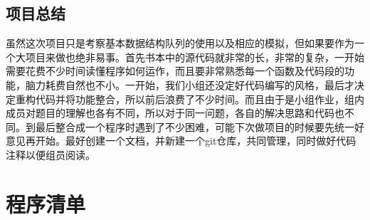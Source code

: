 \documentclass[12pt,UTF8]{ctexart}
\begin{document}
\begin{spacing}{1.4}
\section{项目总结}
	虽然这次项目只是考察基本数据结构队列的使用以及相应的模拟，但如果要作为一个大项目来做也绝非易事。首先书本中的源代码就非常的长，非常的复杂，一开始需要花费不少时间读懂程序如何运作，而且要非常熟悉每一个函数及代码段的功能，脑力耗费自然也不小。一开始，我们小组还没定好代码编写的风格，最后才决定重构代码并将功能整合，所以前后浪费了不少时间。而且由于是小组作业，组内成员对题目的理解也各有不同，所以对于同一问题，各自的解决思路和代码也不同。到最后整合成一个程序时遇到了不少困难，可能下次做项目的时候要先统一好意见再开始。最好创建一个文档，并新建一个git仓库，共同管理，同时做好代码注释以便组员阅读。
\end{spacing}

\section{程序清单}
\end{document}
